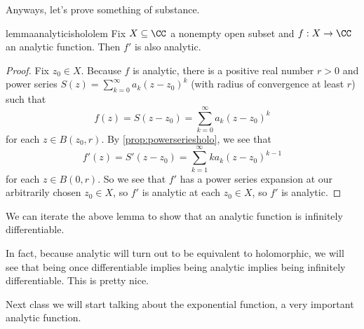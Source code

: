 Anyways, let's prove something of substance.
\begin{restatable}{lemma}{analyticishololem} \label{lem:ddzanaisana}
	Fix $X\subseteq\CC$ a nonempty open subset and $f:X\to\CC$ an analytic function. Then $f'$ is also analytic.
\end{restatable}
\begin{proof}
	Fix $z_0\in X$. Because $f$ is analytic, there is a positive real number $r>0$ and power series $S(z)=\sum_{k=0}^\infty a_k(z-z_0)^k$ (with radius of convergence at least $r$) such that
	\[f(z)=S(z-z_0)=\sum_{k=0}^\infty a_k(z-z_0)^k\]
	for each $z\in B(z_0,r)$. By \autoref{prop:powerseriesholo}, we see that
	\[f'(z)=S'(z-z_0)=\sum_{k=1}^\infty ka_k(z-z_0)^{k-1}\]
	for each $z\in B(0,r)$. So we see that $f'$ has a power series expansion at our arbitrarily chosen $z_0\in X$, so $f'$ is analytic at each $z_0\in X$, so $f'$ is analytic.
\end{proof}
\begin{remark}
	We can iterate the above lemma to show that an analytic function is infinitely differentiable.
\end{remark}
\begin{remark}
	In fact, because analytic will turn out to be equivalent to holomorphic, we will see that being once differentiable implies being analytic implies being infinitely differentiable. This is pretty nice.
\end{remark}
Next class we will start talking about the exponential function, a very important analytic function.